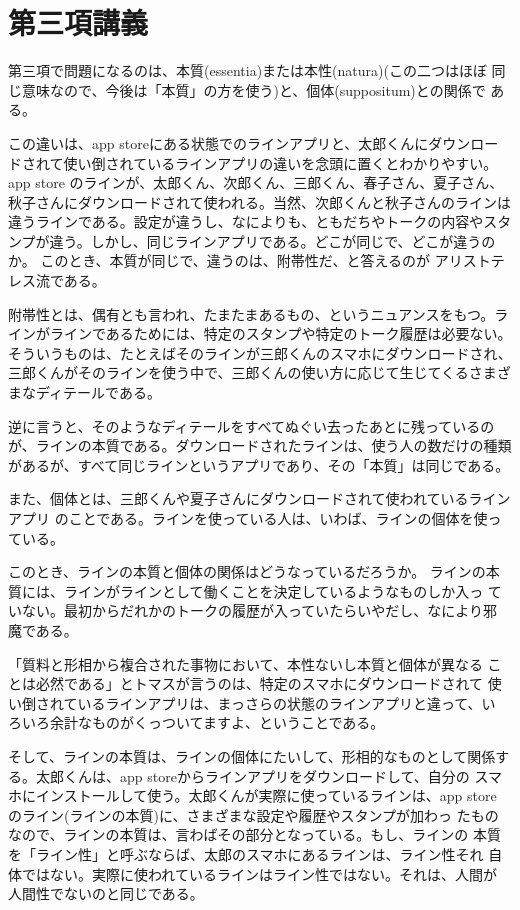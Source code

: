 \documentclass[paper=a4paper,fontsize=10pt,jafontsize=9pt,titlepage]{jlreq}
\begin{document}
\section{第三項講義}

第三項で問題になるのは、本質(essentia)または本性(natura)(この二つはほぼ
同じ意味なので、今後は「本質」の方を使う)と、個体(suppositum)との関係で
ある。

この違いは、app storeにある状態でのラインアプリと、太郎くんにダウンロー
ドされて使い倒されているラインアプリの違いを念頭に置くとわかりやすい。
app store
のラインが、太郎くん、次郎くん、三郎くん、春子さん、夏子さん、
秋子さんにダウンロードされて使われる。当然、次郎くんと秋子さんのラインは
違うラインである。設定が違うし、なによりも、ともだちやトークの内容やスタ
ンプが違う。しかし、同じラインアプリである。どこが同じで、どこが違うのか。
このとき、本質が同じで、違うのは、附帯性だ、と答えるのが
アリストテレス流である。

附帯性とは、偶有とも言われ、たまたまあるもの、というニュアンスをもつ。ラ
インがラインであるためには、特定のスタンプや特定のトーク履歴は必要ない。
そういうものは、たとえばそのラインが三郎くんのスマホにダウンロードされ、
三郎くんがそのラインを使う中で、三郎くんの使い方に応じて生じてくるさまざ
まなディテールである。

逆に言うと、そのようなディテールをすべてぬぐい去ったあとに残っているの
が、ラインの本質である。ダウンロードされたラインは、使う人の数だけの種類
があるが、すべて同じラインというアプリであり、その「本質」は同じである。

また、個体とは、三郎くんや夏子さんにダウンロードされて使われているラインアプリ
のことである。ラインを使っている人は、いわば、ラインの個体を使っ
ている。

このとき、ラインの本質と個体の関係はどうなっているだろうか。
ラインの本質には、ラインがラインとして働くことを決定しているようなものしか入っ
ていない。最初からだれかのトークの履歴が入っていたらいやだし、なにより邪
魔である。

「質料と形相から複合された事物において、本性ないし本質と個体が異なる
ことは必然である」とトマスが言うのは、特定のスマホにダウンロードされて
使い倒されているラインアプリは、まっさらの状態のラインアプリと違って、い
ろいろ余計なものがくっついてますよ、ということである。


そして、ラインの本質は、ラインの個体にたいして、形相的なものとして関係す
る。太郎くんは、app storeからラインアプリをダウンロードして、自分の
スマホにインストールして使う。太郎くんが実際に使っているラインは、app store
のライン(ラインの本質)に、さまざまな設定や履歴やスタンプが加わっ
たものなので、ラインの本質は、言わばその部分となっている。もし、ラインの
本質を「ライン性」と呼ぶならば、太郎のスマホにあるラインは、ライン性それ
自体ではない。実際に使われているラインはライン性ではない。それは、人間が
人間性でないのと同じである。
\end{document}
